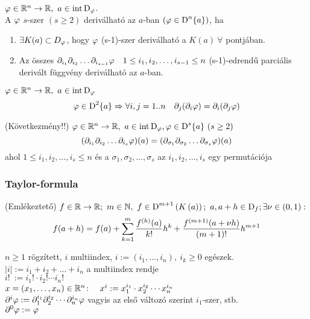 \begin{de}
  $\vfi \in\RnR,\ a\in\intD_\vfi$. \\A $\varphi$ $s$-szer $(s\geq2)$ deriválható az $a$-ban $(\varphi \in\operatorname{D}^{n}\{a\})$, ha
  {\listazjromai
    \begin{enumerate}
    \item $\exists K(a)\subset D_\varphi$, hogy $\varphi$ (s-1)-szer deriválható a $K(a)\ \forall$ pontjában.
    \item Az összes $\partial_{i_1}\partial_{i_2}\ldots\partial_{i_{s-1}}\varphi\quad 1\leq i_1, i_2,\dotsc,i_{s-1} \leq n$
      \quad (s-1)-edrendű parciális derivált függvény deriválható az $a$-ban.
    \end{enumerate}
  }
\end{de}
\begin{te}$\vfi\in\RnR,\ a\in\intD_\vfi$
  \[\varphi \in\operatorname{D}^{2}\{a\}\Rightarrow\forall i,j=1..n\quad \partial_j(\partial_i\varphi) = \partial_i(\partial_j\varphi) \]
\end{te}
\begin{te}\label{te:youngkov}(Következmény!!) $\varphi\in\mathbb{R}^n\to\mathbb{R},\ a\in\operatorname{int\,D}_\varphi, \varphi\in\operatorname{D}^{s}\{a\}\ (s\geq2)$
  \[ (\partial_{i_1}\partial_{i_2}\ldots\partial_{i_s}\varphi)(a) = 
  (\partial_{\sigma_1}\partial_{\sigma_2}\ldots\partial_{\sigma_s}\varphi)(a)\]
  ahol $1\leq i_1, i_2,\dotsc,i_s \leq n$ és a $\sigma_1, \sigma_2,\dotsc,\sigma_s$ az $i_1, i_2,\dotsc,i_s$ egy
  permutációja  
\end{te}

\subsubsection{Taylor-formula}
\begin{te}(Emlékeztető)
  $f\in\R\n\R;\ m\in\N,\ f\in\D^{m+1}\left(K\left(a\right)\right);\ a,a+h\in\D_f;\\\exists \nu\in(0,1):$
  \[\displaystyle f(a+h) = f(a) + \sum_{k=1}^m\dfrac{f^{(h)}(a)}{k!}h^k + \dfrac{f^{(m+1)}(a+\nu h)}{(m+1)!}h^{m+1}\]  
\end{te}

\begin{de}[Multiindex] $n\geq 1$ rögzített, $i$ multiindex, $i:=(i_1,\dotsc,i_n),\ i_k\geq 0$ egészek.\\
  $|i| := i_1 + i_2 + \ldots + i_n$ a multiindex rendje\\
  $i!~ := i_1! \cdot i_2! \dotsm i_n!$\\
  $x=(x_1,\dotsc,x_n)\in\mathbb{R}^n\colon\quad x^i := x_1^{i_1}\cdot x_2^{i_2}\dotsm x_n^{i_n}$\\
  $\partial^i\varphi := \partial_1^{i_1}\partial_2^{i_2}\dotsb\partial_n^{i_n}\varphi$ vagyis az első változó szerint
  $i_1$-szer, stb.\\
  $\partial^0\varphi :=  \varphi$
\end{de}

